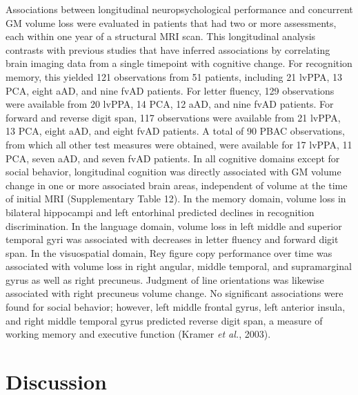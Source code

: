 \documentclass[]{article}
\begin{document}
Associations between longitudinal neuropsychological performance and
concurrent GM volume loss were evaluated in patients that had two or
more assessments, each within one year of a structural MRI scan. This
longitudinal analysis contrasts with previous studies that have inferred
associations by correlating brain imaging data from a single timepoint
with cognitive change. For recognition memory, this yielded 121
observations from 51 patients, including 21 lvPPA, 13 PCA, eight aAD,
and nine fvAD patients. For letter fluency, 129 observations were
available from 20 lvPPA, 14 PCA, 12 aAD, and nine fvAD patients. For
forward and reverse digit span, 117 observations were available from 21
lvPPA, 13 PCA, eight aAD, and eight fvAD patients. A total of 90 PBAC
observations, from which all other test measures were obtained, were
available for 17 lvPPA, 11 PCA, seven aAD, and seven fvAD patients. In
all cognitive domains except for social behavior, longitudinal cognition
was directly associated with GM volume change in one or more associated
brain areas, independent of volume at the time of initial MRI
(Supplementary Table 12). In the memory domain, volume loss in bilateral
hippocampi and left entorhinal predicted declines in recognition
discrimination. In the language domain, volume loss in left middle and
superior temporal gyri was associated with decreases in letter fluency
and forward digit span. In the visuospatial domain, Rey figure copy
performance over time was associated with volume loss in right angular,
middle temporal, and supramarginal gyrus as well as right precuneus.
Judgment of line orientations was likewise associated with right
precuneus volume change. No significant associations were found for
social behavior; however, left middle frontal gyrus, left anterior
insula, and right middle temporal gyrus predicted reverse digit span, a
measure of working memory and executive function (Kramer \emph{et al.},
2003).

\section*{Discussion}\label{discussion}
\end{document}
